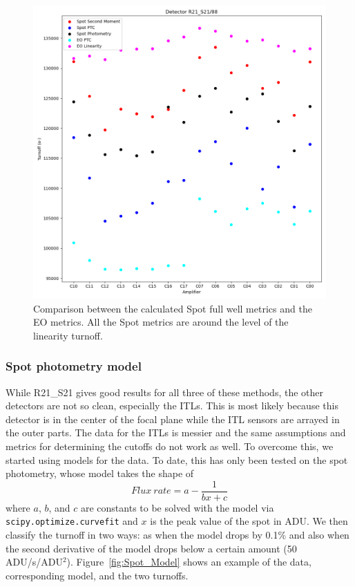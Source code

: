 \begin{figure}[ht]
    \centering
    \includegraphics[width=0.95\linewidth]{figures/Spot_EO_Comparison.png}
    \caption{Comparison between the calculated Spot full well metrics and the EO metrics. All the Spot metrics are around the level of the linearity turnoff.}
    \label{fig:Spot_vs_EO_Metrics}
\end{figure}

\subsubsection{Spot photometry model}

While R21\_S21 gives good results for all three of these methods, the other detectors are not so clean, especially the ITLs. This is most likely because this detector is in the center of the focal plane while the ITL sensors are arrayed in the outer parts.
The data for the ITLs is messier and the same assumptions and metrics for determining the cutoffs do not work as well. To overcome this, we started using models for the data. To date, this has only been tested on the spot photometry, whose model takes the shape of
\begin{equation*}
    Flux \ rate=a-\frac{1}{bx+c}
\end{equation*}
where $a$, $b$, and $c$ are constants to be solved with the model via \texttt{scipy.optimize.curvefit} and $x$ is the peak value of the spot in ADU. We then classify the turnoff in two ways: as when the model drops by 0.1\% and also when the second derivative of the model drops below a certain amount (50 ADU/s/ADU$^{2}$). Figure~\ref{fig:Spot_Model} shows an example of the data, corresponding model, and the two turnoffs.

